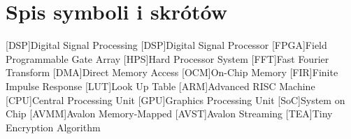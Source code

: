 \chapter*{Spis symboli i skrótów}
\begin{acronym}[TDMA]
[DSP]{Digital Signal Processing}
[DSP]{Digital Signal Processor}
[FPGA]{Field Programmable Gate Array}
[HPS]{Hard Processor System}
[FFT]{Fast Fourier Transform}
[DMA]{Direct Memory Access}
[OCM]{On-Chip Memory}
[FIR]{Finite Impulse Response}
[LUT]{Look Up Table}
[ARM]{Advanced RISC Machine}
[CPU]{Central Processing Unit}
[GPU]{Graphics Processing Unit}
[SoC]{System on Chip}
[AVMM]{Avalon Memory-Mapped}
[AVST]{Avalon Streaming}
[TEA]{Tiny Encryption Algorithm}
\end{acronym}